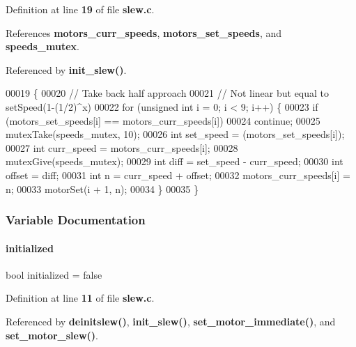 Definition at line \textbf{ 19} of file \textbf{ slew.\+c}.



References \textbf{ motors\+\_\+curr\+\_\+speeds}, \textbf{ motors\+\_\+set\+\_\+speeds}, and \textbf{ speeds\+\_\+mutex}.



Referenced by \textbf{ init\+\_\+slew()}.


\begin{DoxyCode}
00019                     \{
00020   \textcolor{comment}{// Take back half approach}
00021   \textcolor{comment}{// Not linear but equal to setSpeed(1-(1/2)^x)}
00022   \textcolor{keywordflow}{for} (\textcolor{keywordtype}{unsigned} \textcolor{keywordtype}{int} i = 0; i < 9; i++) \{
00023     \textcolor{keywordflow}{if} (motors_set_speeds[i] == motors_curr_speeds[i])
00024       \textcolor{keywordflow}{continue};
00025     mutexTake(speeds_mutex, 10);
00026     \textcolor{keywordtype}{int} set\_speed = (motors_set_speeds[i]);
00027     \textcolor{keywordtype}{int} curr\_speed = motors_curr_speeds[i];
00028     mutexGive(speeds_mutex);
00029     \textcolor{keywordtype}{int} diff = set\_speed - curr\_speed;
00030     \textcolor{keywordtype}{int} offset = diff;
00031     \textcolor{keywordtype}{int} n = curr\_speed + offset;
00032     motors_curr_speeds[i] = n;
00033     motorSet(i + 1, n);
00034   \}
00035 \}
\end{DoxyCode}


\subsubsection{Variable Documentation}
\mbox{\label{a00143_aedeffc7d23da25d52b9a50045189fe2b}} 
\paragraph{initialized}
{\footnotesize\ttfamily bool initialized = false\hspace{0.3cm}{\ttfamily [static]}}



Definition at line \textbf{ 11} of file \textbf{ slew.\+c}.



Referenced by \textbf{ deinitslew()}, \textbf{ init\+\_\+slew()}, \textbf{ set\+\_\+motor\+\_\+immediate()}, and \textbf{ set\+\_\+motor\+\_\+slew()}.

\mbox{\label{a00143_a69e0d1204ea4d87b7366c9cd79527984}} 
